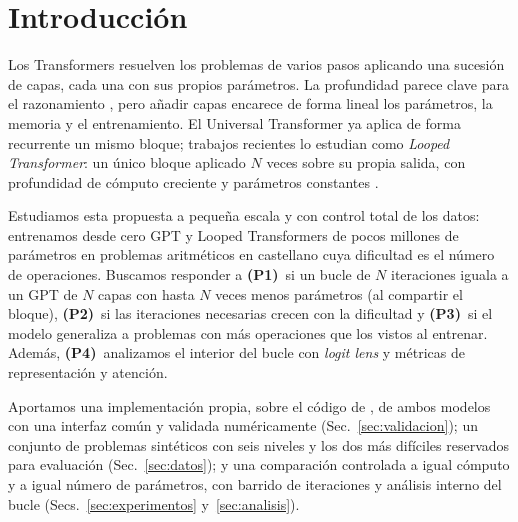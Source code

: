 \section{Introducción}

Los Transformers resuelven los problemas de varios pasos aplicando una sucesión
de capas, cada una con sus propios parámetros. La profundidad parece clave para
el razonamiento \citep{saunshi2025reasoning}, pero añadir capas encarece de forma
lineal los parámetros, la memoria y el entrenamiento. El Universal
Transformer \citep{dehghani2019universal} ya aplica de forma recurrente un mismo
bloque; trabajos recientes lo estudian como \emph{Looped Transformer}: un único
bloque aplicado $N$ veces sobre su propia salida, con profundidad de cómputo
creciente y parámetros constantes
\citep{giannou2023looped,saunshi2025reasoning,geiping2025scaling}.

Estudiamos esta propuesta a pequeña escala y con control total de los datos:
entrenamos desde cero GPT y Looped Transformers de pocos millones de parámetros
en problemas aritméticos en castellano cuya dificultad es el número de
operaciones. Buscamos responder a \textbf{(P1)}~si un bucle de $N$ iteraciones
iguala a un GPT de $N$ capas con hasta $N$ veces menos parámetros (al compartir el bloque),
\textbf{(P2)}~si las iteraciones necesarias crecen con la dificultad y
\textbf{(P3)}~si el modelo generaliza a problemas con más operaciones que los
vistos al entrenar.\ifinterno{} Además, \textbf{(P4)}~analizamos el interior del bucle con \emph{logit lens} y métricas de representación y atención.\fi{}

Aportamos una implementación propia, sobre el código de \citet{raschka2024build},
de ambos modelos con una interfaz común y validada numéricamente
(Sec.~\ref{sec:validacion}); un conjunto de problemas sintéticos con seis niveles
y los dos más difíciles reservados para evaluación (Sec.~\ref{sec:datos}); y una
comparación controlada a igual cómputo y a igual número de parámetros, con
barrido de iteraciones y análisis interno del bucle
(Secs.~\ref{sec:experimentos} y~\ref{sec:analisis}).
